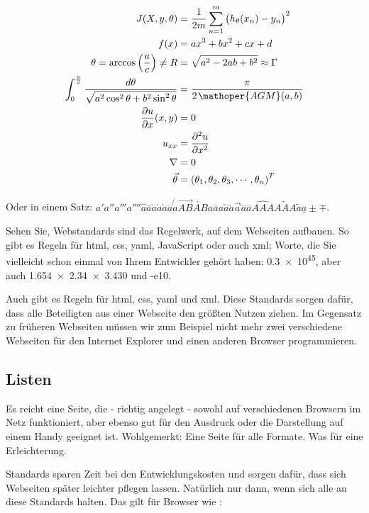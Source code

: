 \begin{align}
  J(X, y, \theta) &= \frac{1}{2m}\sum_{n=1}^m{\big(h_{\theta}(x_{n})-y_{n}\big)^2} \\
  f(x) &= ax^3 + bx^2 + cx + d \\
    \theta = \arccos \left(\frac{a}{c}\right) \neq R &= \sqrt{ a^2 - 2ab + b^2 } \approx \Gamma \\
    \int_0^{\frac{\pi}{2}} \frac{ d \theta}{\sqrt{a^2\cos^2\theta +b^2 \sin^2\theta }} &= \frac{\pi}{2\kern1pt\mathoper{AGM}(a,b)} \\
    \frac{\partial u}{\partial x}(x, y) &= 0 \\
    u_{xx} &= \frac{\partial^2 u}{\partial x^2} \\
    \nabla &= 0 \\
    \vec{\theta} &= \left(\theta_1, \theta_2, \theta_3, \cdots, \theta_n\right)^T
\end{align}

Oder in einem Satz:
\(a' a'' a''' a'''' \hat{a} \bar{a} \grave{a} \acute{a} \dot{a} \ddot{a} \not{a} \overrightarrow{AB} \overleftarrow{AB} \overline{aaa} \check{a} \breve{a} \vec{a} \dddot{a} \ddddot{a} \widehat{AAA} \widetilde{AAA} \tilde{a} \underline{a} \pm \mp\).

Sehen Sie, Webstandards sind das Regelwerk, auf dem Webseiten
aufbauen. So gibt es Regeln für \gls{html}, \gls{css}, \gls{yaml},
JavaScript oder auch \gls{xml}; Worte, die Sie vielleicht schon
einmal von Ihrem Entwickler gehört haben: \num{.3e45}, aber auch
\num{1.654 x 2.34 x 3.430} und \num{-e10}.

Auch gibt es Regeln für \gls{html}, \gls{css}, \gls{yaml} und \gls{xml}. Diese Standards sorgen
dafür, dass alle Beteiligten aus einer Webseite den größten Nutzen
ziehen. Im Gegensatz zu früheren Webseiten müssen wir zum Beispiel
nicht mehr zwei verschiedene Webseiten für den Internet Explorer und
einen anderen Browser programmieren.

\hypertarget{listen}{%
\subsection{Listen}\label{listen}}

Es reicht eine Seite, die - richtig angelegt - sowohl auf
verschiedenen Browsern im Netz funktioniert, aber ebenso gut für den
Ausdruck oder die Darstellung auf einem Handy geeignet ist.
Wohlgemerkt: Eine Seite für alle Formate. Was für eine
Erleichterung.

Standards sparen Zeit bei den Entwicklungskosten und sorgen dafür,
dass sich Webseiten später leichter pflegen lassen. Natürlich nur
dann, wenn sich alle an diese Standards halten. Das gilt für Browser
wie \autocite[vgl.][10-15]{Al-Rfou_TheanoPython_2016}:

